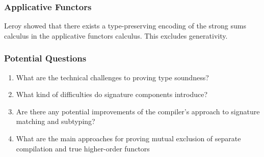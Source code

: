 \documentclass{beamer}
\begin{document}

\begin{frame}
\frametitle{Applicative Functors}
Leroy showed that there exists a type-preserving encoding of the strong sums calculus in the applicative functors calculus. This excludes generativity. 
\end{frame}

\begin{frame}
\frametitle{Potential Questions}
\begin{enumerate}
	\item What are the technical challenges to proving type soundness?
	\item What kind of difficulties do signature components introduce?
	\item Are there any potential improvements of the compiler's approach to signature matching and subtyping?
	\item What are the main approaches for proving mutual exclusion of separate compilation and true higher-order functors
\end{enumerate}	
\end{frame}
\end{document}
